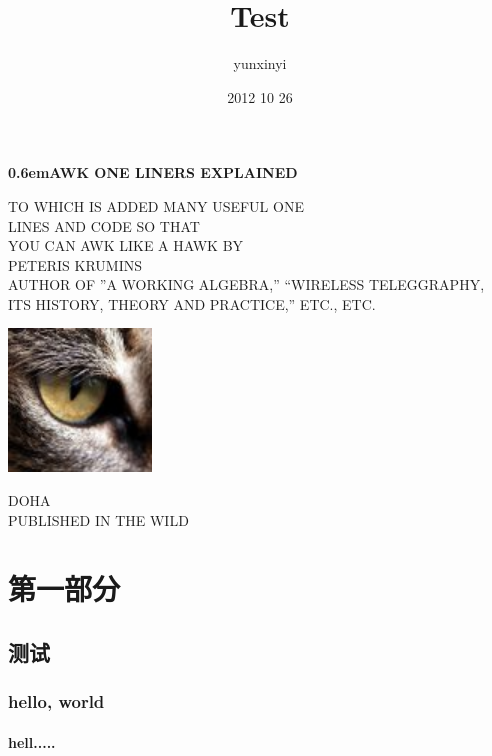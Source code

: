 \documentclass[UTF-8,hyperref]{book}
\title{Test}
\author{yunxinyi}
\date{2012 10 26}
\begin{document}
\clearpage
\newcommand\nbvspace[1][3]{\vspace*{\stretch{#1}}}
\newcommand\nbstretchyspace{\spaceskip0.5em plus 0.25em minus 0.25em}
\newcommand{\nbtitlestretch}{\spaceskip0.6em}
\pagestyle{empty}
\begin{center}
	\bfseries
	\nbvspace[1]
	\Huge
	{\nbtitlestretch\huge AWK ONE LINERS EXPLAINED}


	\nbvspace[1]
	\normalsize


	TO WHICH IS ADDED MANY USEFUL ONE\\
	LINES AND CODE SO THAT\\
	YOU CAN AWK LIKE A HAWK
	\nbvspace[1]
	\small BY\\
	\Large PETERIS KRUMINS\\[0.5em]
	\footnotesize AUTHOR OF ''A WORKING ALGEBRA,'' ``WIRELESS TELEGGRAPHY,\\
	ITS HISTORY, THEORY AND PRACTICE,'' ETC., ETC.


	\nbvspace[2]


	\includegraphics[width=1.5in]{./icon.png}
	\nbvspace[3]
	\normalsize

	DOHA\\
	\Large
	PUBLISHED IN THE WILD
	\nbvspace[1]
\end{center}
\maketitle
\tableofcontents
{}
\part{第一部分}
\chapter{测试}
\section{hello, world}
\subsection{hell.....}
\end{document}
